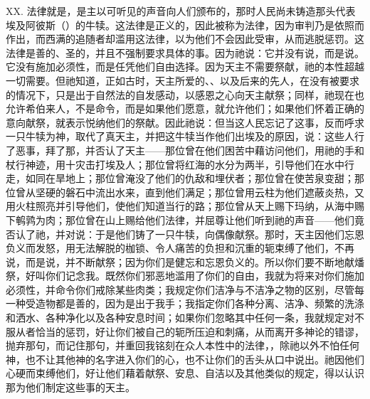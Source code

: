 XX. 法律就是，是主以可听见的声音向人们颁布的，那时人民尚未铸造那头代表埃及阿彼斯（）的牛犊。这法律是正义的，因此被称为法律，因为审判乃是依照而作出，而西满的追随者却滥用这法律，以为他们不会因此受审，从而逃脱惩罚。这法律是善的、圣的，并且不强制要求具体的事。因为祂说：它并没有说，而是说。它没有施加必须性，而是任凭他们自由选择。因为天主不需要祭献，祂的本性超越一切需要。但祂知道，正如古时，天主所爱的、、以及后来的先人，在没有被要求的情况下，只是出于自然法的自发感动，以感恩之心向天主献祭；同样，祂现在也允许希伯来人，不是命令，而是如果他们愿意，就允许他们；如果他们怀着正确的意向献祭，就表示悦纳他们的祭献。因此祂说：但当这人民忘记了这事，反而呼求一只牛犊为神，取代了真天主，并把这牛犊当作他们出埃及的原因，说：这些人行了恶事，拜了那，并否认了天主——那位曾在他们困苦中藉访问他们，用祂的手和杖行神迹，用十灾击打埃及人；那位曾将红海的水分为两半，引导他们在水中行走，如同在旱地上；那位曾淹没了他们的仇敌和埋伏者；那位曾在使苦泉变甜；那位曾从坚硬的磐石中流出水来，直到他们满足；那位曾用云柱为他们遮蔽炎热，又用火柱照亮并引导他们，使他们知道当行的路；那位曾从天上赐下玛纳，从海中赐下鹌鹑为肉；那位曾在山上赐给他们法律，并屈尊让他们听到祂的声音——他们竟否认了祂，并对说：于是他们铸了一只牛犊，向偶像献祭。那时，天主因他们忘恩负义而发怒，用无法解脱的枷锁、令人痛苦的负担和沉重的轭束缚了他们，不再说，而是说，并不断献祭；因为你们是健忘和忘恩负义的。所以你们要不断地献燔祭，好叫你们记念我。既然你们邪恶地滥用了你们的自由，我就为将来对你们施加必须性，并命令你们戒除某些肉类；我规定你们洁净与不洁净之物的区别，尽管每一种受造物都是善的，因为是出于我手；我指定你们各种分离、洁净、频繁的洗涤和洒水、各种净化以及各种安息时间；如果你们忽略其中任何一条，我就规定对不服从者恰当的惩罚，好让你们被自己的轭所压迫和刺痛，从而离开多神论的错谬，抛弃那句，而记住那句，并重回我铭刻在众人本性中的法律，，除祂以外不怕任何神，也不让其他神的名字进入你们的心，也不让你们的舌头从口中说出。祂因他们心硬而束缚他们，好让他们藉着献祭、安息、自洁以及其他类似的规定，得以认识那为他们制定这些事的天主。\par

